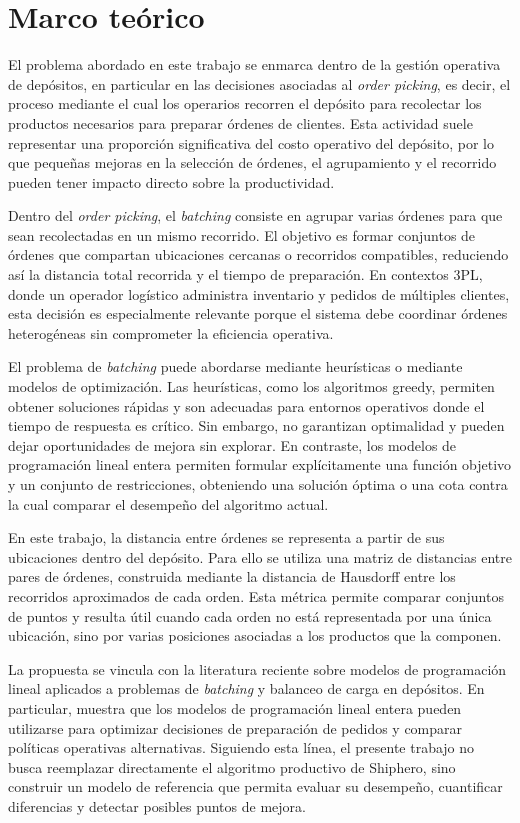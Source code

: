 \documentclass[a4paper,openany]{memoir}
\begin{document}
\chapter{Marco teórico}

El problema abordado en este trabajo se enmarca dentro de la gestión operativa de depósitos, en particular en las decisiones asociadas al \textit{order picking}, es decir, el proceso mediante el cual los operarios recorren el depósito para recolectar los productos necesarios para preparar órdenes de clientes. Esta actividad suele representar una proporción significativa del costo operativo del depósito, por lo que pequeñas mejoras en la selección de órdenes, el agrupamiento y el recorrido pueden tener impacto directo sobre la productividad.

Dentro del \textit{order picking}, el \textit{batching} consiste en agrupar varias órdenes para que sean recolectadas en un mismo recorrido. El objetivo es formar conjuntos de órdenes que compartan ubicaciones cercanas o recorridos compatibles, reduciendo así la distancia total recorrida y el tiempo de preparación. En contextos 3PL, donde un operador logístico administra inventario y pedidos de múltiples clientes, esta decisión es especialmente relevante porque el sistema debe coordinar órdenes heterogéneas sin comprometer la eficiencia operativa.

El problema de \textit{batching} puede abordarse mediante heurísticas o mediante modelos de optimización. Las heurísticas, como los algoritmos greedy, permiten obtener soluciones rápidas y son adecuadas para entornos operativos donde el tiempo de respuesta es crítico. Sin embargo, no garantizan optimalidad y pueden dejar oportunidades de mejora sin explorar. En contraste, los modelos de programación lineal entera permiten formular explícitamente una función objetivo y un conjunto de restricciones, obteniendo una solución óptima o una cota contra la cual comparar el desempeño del algoritmo actual.

En este trabajo, la distancia entre órdenes se representa a partir de sus ubicaciones dentro del depósito. Para ello se utiliza una matriz de distancias entre pares de órdenes, construida mediante la distancia de Hausdorff entre los recorridos aproximados de cada orden. Esta métrica permite comparar conjuntos de puntos y resulta útil cuando cada orden no está representada por una única ubicación, sino por varias posiciones asociadas a los productos que la componen.

La propuesta se vincula con la literatura reciente sobre modelos de programación lineal aplicados a problemas de \textit{batching} y balanceo de carga en depósitos. En particular, \cite{tarczynskiLinearProgrammingModels2023} muestra que los modelos de programación lineal entera pueden utilizarse para optimizar decisiones de preparación de pedidos y comparar políticas operativas alternativas. Siguiendo esta línea, el presente trabajo no busca reemplazar directamente el algoritmo productivo de Shiphero, sino construir un modelo de referencia que permita evaluar su desempeño, cuantificar diferencias y detectar posibles puntos de mejora.

    \backmatter         %

\printbibliography
\end{document}
